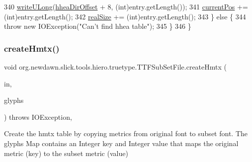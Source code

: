 \begin{DoxyCode}
340             \mbox{\hyperlink{classorg_1_1newdawn_1_1slick_1_1tools_1_1hiero_1_1truetype_1_1_t_t_f_sub_set_file_a20ed1072913a1ad998d59a761e8c4817}{writeULong}}(\mbox{\hyperlink{classorg_1_1newdawn_1_1slick_1_1tools_1_1hiero_1_1truetype_1_1_t_t_f_sub_set_file_ab789ab20f7a6b3b093b7753d38d44ce2}{hheaDirOffset}} + 8, (\textcolor{keywordtype}{int})entry.getLength());
341             \mbox{\hyperlink{classorg_1_1newdawn_1_1slick_1_1tools_1_1hiero_1_1truetype_1_1_t_t_f_sub_set_file_a5027011db0d9c307afa8de09102eaa10}{currentPos}} += (int)entry.getLength();
342             \mbox{\hyperlink{classorg_1_1newdawn_1_1slick_1_1tools_1_1hiero_1_1truetype_1_1_t_t_f_sub_set_file_afbd6781b24988e94a488596aa954ee3c}{realSize}} += (int)entry.getLength();
343         \} \textcolor{keywordflow}{else} \{
344             \textcolor{keywordflow}{throw} \textcolor{keyword}{new} IOException(\textcolor{stringliteral}{"Can't find hhea table"});
345         \}
346     \}
\end{DoxyCode}
\mbox{\label{classorg_1_1newdawn_1_1slick_1_1tools_1_1hiero_1_1truetype_1_1_t_t_f_sub_set_file_acc4a0187159ed3205b6cf9d981f5a64c}} 
\subsubsection{\texorpdfstring{create\+Hmtx()}{createHmtx()}}
{\footnotesize\ttfamily void org.\+newdawn.\+slick.\+tools.\+hiero.\+truetype.\+T\+T\+F\+Sub\+Set\+File.\+create\+Hmtx (\begin{DoxyParamCaption}\item[{\mbox{\hyperlink{classorg_1_1newdawn_1_1slick_1_1tools_1_1hiero_1_1truetype_1_1_font_file_reader}{Font\+File\+Reader}}}]{in,  }\item[{Map}]{glyphs }\end{DoxyParamCaption}) throws I\+O\+Exception\hspace{0.3cm}{\ttfamily [inline]}, {\ttfamily [private]}}

Create the hmtx table by copying metrics from original font to subset font. The glyphs Map contains an Integer key and Integer value that maps the original metric (key) to the subset metric (value)


